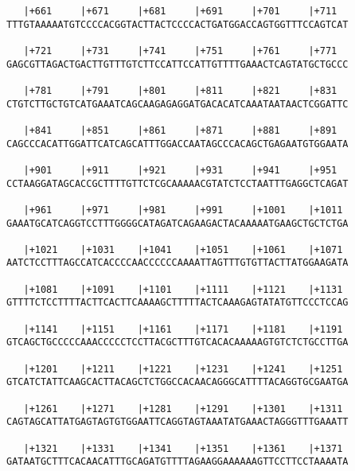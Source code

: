 \documentclass{article}
\begin{document}
\begin{Verbatim}
   |+661     |+671     |+681     |+691     |+701     |+711  
TTTGTAAAAATGTCCCCACGGTACTTACTCCCCACTGATGGACCAGTGGTTTCCAGTCAT
                                                            
   |+721     |+731     |+741     |+751     |+761     |+771  
GAGCGTTAGACTGACTTGTTTGTCTTCCATTCCATTGTTTTGAAACTCAGTATGCTGCCC
                                                            
   |+781     |+791     |+801     |+811     |+821     |+831  
CTGTCTTGCTGTCATGAAATCAGCAAGAGAGGATGACACATCAAATAATAACTCGGATTC
                                                            
   |+841     |+851     |+861     |+871     |+881     |+891  
CAGCCCACATTGGATTCATCAGCATTTGGACCAATAGCCCACAGCTGAGAATGTGGAATA
                                                            
   |+901     |+911     |+921     |+931     |+941     |+951  
CCTAAGGATAGCACCGCTTTTGTTCTCGCAAAAACGTATCTCCTAATTTGAGGCTCAGAT
                                                            
   |+961     |+971     |+981     |+991     |+1001    |+1011 
GAAATGCATCAGGTCCTTTGGGGCATAGATCAGAAGACTACAAAAATGAAGCTGCTCTGA
                                                            
   |+1021    |+1031    |+1041    |+1051    |+1061    |+1071 
AATCTCCTTTAGCCATCACCCCAACCCCCCAAAATTAGTTTGTGTTACTTATGGAAGATA
                                                            
   |+1081    |+1091    |+1101    |+1111    |+1121    |+1131 
GTTTTCTCCTTTTACTTCACTTCAAAAGCTTTTTACTCAAAGAGTATATGTTCCCTCCAG
                                                            
   |+1141    |+1151    |+1161    |+1171    |+1181    |+1191 
GTCAGCTGCCCCCAAACCCCCTCCTTACGCTTTGTCACACAAAAAGTGTCTCTGCCTTGA
                                                            
   |+1201    |+1211    |+1221    |+1231    |+1241    |+1251 
GTCATCTATTCAAGCACTTACAGCTCTGGCCACAACAGGGCATTTTACAGGTGCGAATGA
                                                            
   |+1261    |+1271    |+1281    |+1291    |+1301    |+1311 
CAGTAGCATTATGAGTAGTGTGGAATTCAGGTAGTAAATATGAAACTAGGGTTTGAAATT
                                                            
   |+1321    |+1331    |+1341    |+1351    |+1361    |+1371 
GATAATGCTTTCACAACATTTGCAGATGTTTTAGAAGGAAAAAAGTTCCTTCCTAAAATA
                                                            

\end{Verbatim}
\end{document}
